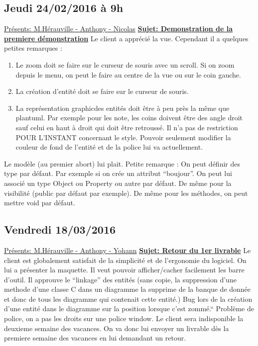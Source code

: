 \documentclass[a4paper,10pt]{article}
\begin{document}
\subsection{Jeudi 24/02/2016 à 9h}
\underline{Présents: M.Hérauville - Anthony - Nicolas}\newline
\textbf{\underline{Sujet: Demonstration de la premiere démonstration}}\newline
Le client a apprécié la vue. Cependant il a quelques petites remarques :
\begin{enumerate}
 \item Le zoom doit se faire sur le curseur de souris avec un scroll. Si on zoom depuis le menu, 
	on peut le faire au centre de la vue ou sur le coin gauche.
 \item La création d'entité doit se faire sur le curseur de souris.
 \item La représentation graphicdes entités doit être à peu près la même que plantuml. Par exemple pour les note, les coins doivent 
 être des angle droit sauf celui en haut à droit qui doit être retroussé. Il n'a pas de restriction POUR L'INSTANT concernant le style.
 Pouvoir seulement modifier la couleur de fond de l'entité et de la police lui va actuellement.
\end{enumerate}
Le modèle (au premier abort) lui plait. Petite remarque : On peut définir des type par défaut. 
Par exemple si on crée un attribut ``boujour''. On peut lui associé un type Object ou Property ou autre par défaut.
De même pour la visibilité (public par défaut par exemple). De même pour les méthodes, on peut mettre void par défaut.


\subsection{Vendredi 18/03/2016}
\underline{Présents: M.Hérauville - Anthony - Yohann}\newline
\textbf{\underline{Sujet: Retour du 1er livrable}}\newline
Le client est globalement satisfait de la simplicité et de l'ergonomie du logiciel. On lui a présenter la maquette.
Il veut pouvoir afficher/cacher facilement les barre d'outil. Il approuve le ``linkage'' des entités (sans copie, la suppression d'une methode d'une classe C dans un diagramme 
la supprime de la banque de donnée et donc de tous les diagramme qui contenait cette entité.)
Bug lors de la création d'une entité dans le diagramme sur la position lorsque c'est zommé.``
Problème de police, on a pas les droits sur une police window.
Le client sera indisponible la deuxieme semaine des vacances. On va donc lui envoyer un livrable dès la premiere semaine des vacances en lui demandant 
un retour.
\end{document}
